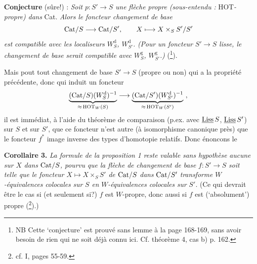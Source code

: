 \textbf{Conjecture} (sûre!) : \textit{Soit $p : S' \longrightarrow S$ une flèche propre (sous-entendu :} HOT\textit{-propre) dans} Cat. \textit{Alors le foncteur changement de base}
\[
\mathrm{Cat}/S \longrightarrow \mathrm{Cat}/S', \qquad X \longmapsto X \times_S S'/S'
\]
\textit{est compatible avec les localiseurs $W_S^{\mathrm{d}}$, $W_{S'}^{\mathrm{d}}$. (Pour un foncteur $S' \longrightarrow S$ lisse, le changement de base serait compatible avec $W_S^{\mathrm{g}}$, $W_{S'}^{\mathrm{g}}$.)} (\footnote[61]{NB Cette `conjecture' est prouvé sans lemme à la page 168-169, sans avoir besoin de rien qui ne soit %
déjà connu ici. Cf. théorème 4, cas b) p. 162.}).

Mais pout tout changement de base $S' \longrightarrow S$ (propre ou non) qui a la propriété précédente, %
donc qui induit un foncteur
\[
\underbrace{(\Cat/S)(W_S^{\mathrm{d}})^{-1}}_{\approx\,\HOT_W(S)} \longrightarrow \underbrace{(\Cat/S')(W_{S'}^{\mathrm{d}})^{-1}}_{\approx\,\HOT_W(S')}\ ,
\]
il est immédiat, à l'aide du théorème de comparaison (p.ex. avec $\underline{\mathrm{Liss}}\,S$, $\underline{\mathrm{Liss}}\,S'$) sur $S$ et sur $S'$, que ce foncteur n'est autre (à isomorphisme canonique près) que le foncteur $f^*$ image inverse des types d'homotopie relatifs. Donc énoncons le %

\textbf{Corollaire 3.} \textit{La formule de la proposition 1 reste valable sans hypothèse aucune sur $X$ dans} $\mathrm{Cat}/S$\textit{, pourvu que la flèche de changement de base $f : S' \longrightarrow S$ soit telle que le foncteur $X \longmapsto X \times_S S'$ de} $\mathrm{Cat}/S$ \textit{dans} $\mathrm{Cat}/S'$
\textit{transforme $W$-équivalences colocales sur $S$ en $W$-équivalences colocales sur $S'$.} (Ce qui devrait être le cas si (et seulement si?) $f$ est $W$-propre, donc aussi si $f$ est (`absolument') propre (\footnote[62]{cf. I, pages 55-59.}).)

